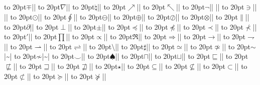 \bin\hbox to 20pt{$\mp$\quad\hss}\@|\mp|
\ord\hbox to 20pt{$\nabla$\quad\hss}\@|\nabla|
\ord\hbox to 20pt{$\natural$\quad\hss}\@|\natural|
\rel\hbox to 20pt{$\nearrow$\quad\hss}\@|\nearrow| 
\rel\hbox to 20pt{$\nwarrow$\quad\hss}\@|\nwarrow|
\ord\hbox to 20pt{$\neg$\quad\hss}\@|\neg| \@|\lnot|
\rel\hbox to 20pt{$\ni$\quad\hss}\@|\ni| \@|\owns|
\bin\hbox to 20pt{$\odot$\quad\hss}\@|\odot|
\op\hbox to 20pt{$\oint$\quad\hss}\@|\oint|
\bin\hbox to 20pt{$\ominus$\quad\hss}\@|\ominus|
\bin\hbox to 20pt{$\oplus$\quad\hss}\@|\oplus|
\bin\hbox to 20pt{$\oslash$\quad\hss}\@|\oslash|
\bin\hbox to 20pt{$\otimes$\quad\hss}\@|\otimes|
\rel\hbox to 20pt{$\parallel$\quad\hss}\@|\parallel|
\ord\hbox to 20pt{$\partial$\quad\hss}\@|\partial|
\bin\hbox to 20pt{$\perp$\quad\hss}\@|\perp|
\bin\hbox to 20pt{$\pm$\quad\hss}\@|\pm|
\rel\hbox to 20pt{$\preceq$\quad\hss}\@|\preceq|
\rel\hbox to 20pt{$\not\preceq$\quad\hss}\@|\not\preceq|
\rel\hbox to 20pt{$\prec$\quad\hss}\@|\prec|
\rel\hbox to 20pt{$\not\prec$\quad\hss}\@|\not\prec|
\ord\hbox to 20pt{$\prime$\quad\hss}\@|\prime|
\op\hbox to 20pt{$\prod$\quad\hss}\@|\prod|
\rel\hbox to 20pt{$\propto$\quad\hss}\@|\propto|
\ord\hbox to 20pt{$\Re$\quad\hss}\@|\Re|
\rel\hbox to 20pt{$\Rightarrow$\quad\hss}\@|\Rightarrow| 
\rel\hbox to 20pt{$\rightarrow$\quad\hss}\@|\rightarrow| 
\rel\hbox to 20pt{$\rightharpoondown$\quad\hss}\@|\rightharpoondown|  
\rel\hbox to 20pt{$\rightharpoonup$\quad\hss}\@|\rightharpoonup|  
\rel\hbox to 20pt{$\rightleftharpoons$\quad\hss}\@|\rightleftharpoons|
\bin\hbox to 20pt{$\setminus$\quad\hss}\@|\setminus|
\ord\hbox to 20pt{$\sharp$\quad\hss}\@|\sharp|
\rel\hbox to 20pt{$\simeq$\quad\hss}\@|\simeq|
\rel\hbox to 20pt{$\not\simeq$\quad\hss}\@|\not\simeq|
\rel\hbox to 20pt{$\sim$\quad\hss}\@|\sim|
\rel\hbox to 20pt{$\not\sim$\quad\hss}\@|\not\sim|
\rel\hbox to 20pt{$\smile$\quad\hss}\@|\smile|
\ord\hbox to 20pt{$\spadesuit$\quad\hss}\@|\spadesuit|
\bin\hbox to 20pt{$\sqcap$\quad\hss}\@|\sqcap|
\bin\hbox to 20pt{$\sqcup$\quad\hss}\@|\sqcup|
\rel\hbox to 20pt{$\sqsubseteq$\quad\hss}\@|\sqsubseteq|
\rel\hbox to 20pt{$\not\sqsubseteq$\quad\hss}\@|\not\sqsubseteq|
\rel\hbox to 20pt{$\sqsupseteq$\quad\hss}\@|\sqsupseteq|
\rel\hbox to 20pt{$\not\sqsupseteq$\quad\hss}\@|\not\sqsupseteq|
\ord\hbox to 20pt{$\star$\quad\hss}\@|\star|
\rel\hbox to 20pt{$\subseteq$\quad\hss}\@|\subseteq|
\rel\hbox to 20pt{$\not\subseteq$\quad\hss}\@|\not\subseteq|
\rel\hbox to 20pt{$\subset$\quad\hss}\@|\subset|
\rel\hbox to 20pt{$\not\subset$\quad\hss}\@|\not\subset|
\rel\hbox to 20pt{$\succeq$\quad\hss}\@|\succeq|
\rel\hbox to 20pt{$\not\succeq$\quad\hss}\@|\not\succeq|

